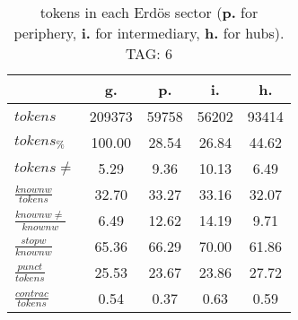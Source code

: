 \begin{table}[h!]
\begin{center}
\begin{tabular}{| l || c | c | c | c |}\hline
 & {\bf g.} & {\bf p.} & {\bf i.} & {\bf h.} \\\hline\hline
$tokens$ & 209373  & 59758  & 56202  & 93414 \\
$tokens_{\%}$ & 100.00  & 28.54  & 26.84  & 44.62 \\
$tokens \neq$ & 5.29  & 9.36  & 10.13  & 6.49 \\\hline
$\frac{knownw}{tokens}$ & 32.70  & 33.27  & 33.16  & 32.07 \\
$\frac{knownw \neq}{knownw}$ & 6.49  & 12.62  & 14.19  & 9.71 \\\hline
$\frac{stopw}{knownw}$ & 65.36  & 66.29  & 70.00  & 61.86 \\
$\frac{punct}{tokens}$ & 25.53  & 23.67  & 23.86  & 27.72 \\
$\frac{contrac}{tokens}$ & 0.54  & 0.37  & 0.63  & 0.59 \\\hline
\end{tabular}
\caption{tokens in each Erd\"os sector ({{\bf p.}} for periphery, {{\bf i.}} for intermediary, 
    {{\bf h.}} for hubs). TAG: 6}
\end{center}
\end{table}